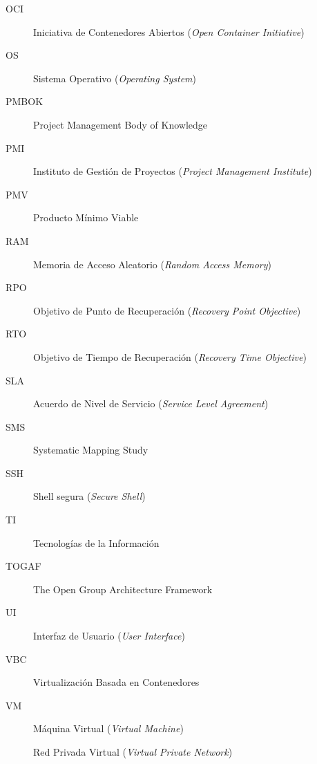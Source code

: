 \begin{description}
  \item[OCI] Iniciativa de Contenedores Abiertos (\textit{Open Container Initiative})
  \item[OS] Sistema Operativo (\textit{Operating System})
  \item[PMBOK] Project Management Body of Knowledge
  \item[PMI] Instituto de Gestión de Proyectos (\textit{Project Management Institute})
  \item[PMV] Producto Mínimo Viable
  \item[RAM] Memoria de Acceso Aleatorio (\textit{Random Access Memory})
  \item[RPO] Objetivo de Punto de Recuperación (\textit{Recovery Point Objective})
  \item[RTO] Objetivo de Tiempo de Recuperación (\textit{Recovery Time Objective})
  \item[SLA] Acuerdo de Nivel de Servicio (\textit{Service Level Agreement})
  \item[SMS] Systematic Mapping Study
  \item[SSH] Shell segura (\textit{Secure Shell})
  \item[TI] Tecnologías de la Información
  \item[TOGAF] The Open Group Architecture Framework
  \item[UI] Interfaz de Usuario (\textit{User Interface})
  \item[VBC] Virtualización Basada en Contenedores
  \item[VM] Máquina Virtual (\textit{Virtual Machine})
  \item[\VPN] Red Privada Virtual (\textit{Virtual Private Network})
\end{description}